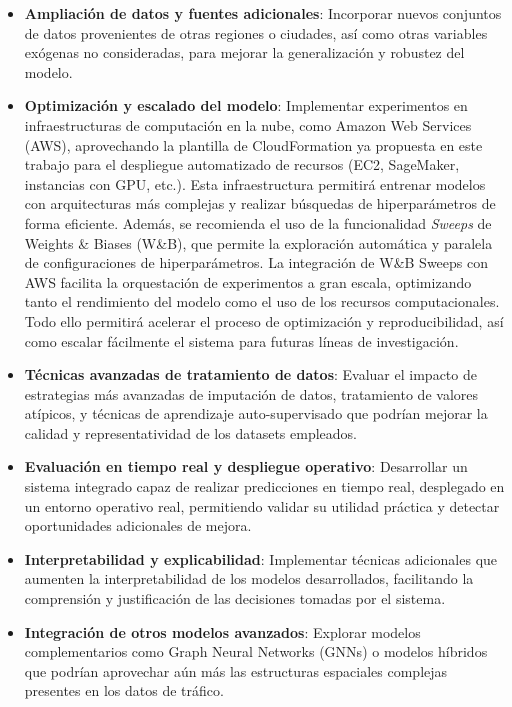\begin{itemize}
	\item \textbf{Ampliación de datos y fuentes adicionales}: Incorporar nuevos conjuntos de datos provenientes de otras regiones o ciudades, así como otras variables exógenas no consideradas, para mejorar la generalización y robustez del modelo.
	\item \textbf{Optimización y escalado del modelo}: Implementar experimentos en infraestructuras de computación en la nube, como Amazon Web Services (AWS), aprovechando la plantilla de CloudFormation ya propuesta en este trabajo para el despliegue automatizado de recursos (EC2, SageMaker, instancias con GPU, etc.). Esta infraestructura permitirá entrenar modelos con arquitecturas más complejas y realizar búsquedas de hiperparámetros de forma eficiente. 
	Además, se recomienda el uso de la funcionalidad \textit{Sweeps} de Weights \& Biases (W\&B), que permite la exploración automática y paralela de configuraciones de hiperparámetros. La integración de W\&B Sweeps con AWS facilita la orquestación de experimentos a gran escala, optimizando tanto el rendimiento del modelo como el uso de los recursos computacionales. Todo ello permitirá acelerar el proceso de optimización y reproducibilidad, así como escalar fácilmente el sistema para futuras líneas de investigación.
	\item \textbf{Técnicas avanzadas de tratamiento de datos}: Evaluar el impacto de estrategias más avanzadas de imputación de datos, tratamiento de valores atípicos, y técnicas de aprendizaje auto-supervisado que podrían mejorar la calidad y representatividad de los datasets empleados.
	\item \textbf{Evaluación en tiempo real y despliegue operativo}: Desarrollar un sistema integrado capaz de realizar predicciones en tiempo real, desplegado en un entorno operativo real, permitiendo validar su utilidad práctica y detectar oportunidades adicionales de mejora.
	\item \textbf{Interpretabilidad y explicabilidad}: Implementar técnicas adicionales que aumenten la interpretabilidad de los modelos desarrollados, facilitando la comprensión y justificación de las decisiones tomadas por el sistema.
	\item \textbf{Integración de otros modelos avanzados}: Explorar modelos complementarios como Graph Neural Networks (GNNs) o modelos híbridos que podrían aprovechar aún más las estructuras espaciales complejas presentes en los datos de tráfico.
\end{itemize}



